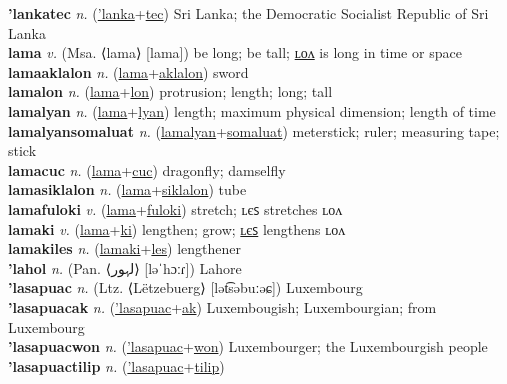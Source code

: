 \textbf{'lankatec} \textit{n.} (\hyperref['lanka]{'lanka}+\hyperref[tec]{tec})
Sri Lanka; the Democratic Socialist Republic of Sri Lanka \label{'lankatec} \\
\textbf{lama} \textit{v.} (Msa. ⟨lama⟩ [lama])
be long; be tall; \hyperref[lamalon]{ʟᴏᴧ} is long in time or space \label{lama} \\
\textbf{lamaaklalon} \textit{n.} (\hyperref[lama]{lama}+\hyperref[aklalon]{aklalon})
sword \label{lamaaklalon} \\
\textbf{lamalon} \textit{n.} (\hyperref[lama]{lama}+\hyperref[lon]{lon})
protrusion; length; long; tall \label{lamalon} \\
\textbf{lamalyan} \textit{n.} (\hyperref[lama]{lama}+\hyperref[lyan]{lyan})
length; maximum physical dimension; length of time \label{lamalyan} \\
\textbf{lamalyansomaluat} \textit{n.} (\hyperref[lamalyan]{lamalyan}+\hyperref[somaluat]{somaluat})
meterstick; ruler; measuring tape; stick \label{lamalyansomaluat} \\
\textbf{lamacuc} \textit{n.} (\hyperref[lama]{lama}+\hyperref[cuc]{cuc})
dragonfly; damselfly \label{lamacuc} \\
\textbf{lamasiklalon} \textit{n.} (\hyperref[lama]{lama}+\hyperref[siklalon]{siklalon})
tube \label{lamasiklalon} \\
\textbf{lamafuloki} \textit{v.} (\hyperref[lama]{lama}+\hyperref[fuloki]{fuloki})
stretch; ʟєꜱ stretches ʟᴏᴧ \label{lamafuloki} \\
\textbf{lamaki} \textit{v.} (\hyperref[lama]{lama}+\hyperref[ki]{ki})
lengthen; grow; \hyperref[lamakiles]{ʟєꜱ} lengthens ʟᴏᴧ \label{lamaki} \\
\textbf{lamakiles} \textit{n.} (\hyperref[lamaki]{lamaki}+\hyperref[les]{les})
lengthener \label{lamakiles} \\
\textbf{'lahol} \textit{n.} (Pan. ⟨لہور⟩ [ləˈhɔːɾ])
Lahore \label{'lahol} \\
\textbf{'lasapuac} \textit{n.} (Ltz. ⟨Lëtzebuerg⟩ [lət͡səbuːəɕ])
Luxembourg \label{'lasapuac} \\
\textbf{'lasapuacak} \textit{n.} (\hyperref['lasapuac]{'lasapuac}+\hyperref[ak]{ak})
Luxembougish; Luxembourgian; from Luxembourg \label{'lasapuacak} \\
\textbf{'lasapuacwon} \textit{n.} (\hyperref['lasapuac]{'lasapuac}+\hyperref[won]{won})
Luxembourger; the Luxembourgish people \label{'lasapuacwon} \\
\textbf{'lasapuactilip} \textit{n.} (\hyperref['lasapuac]{'lasapuac}+\hyperref[tilip]{tilip})
